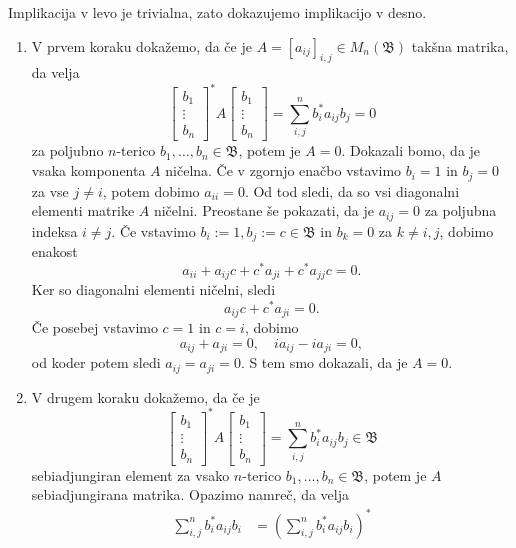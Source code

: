 \begin{dokaz}
    Implikacija v levo je trivialna, zato dokazujemo implikacijo v desno.
    \begin{enumerate}
        \item  V prvem koraku dokažemo, da če je $A = [a_{ij}]_{i, j} \in M_n (\mathfrak{B})$ takšna matrika, da velja $$\begin{bmatrix}
        b_1 \\ \vdots \\ b_n
    \end{bmatrix}^* A \begin{bmatrix}
        b_1 \\ \vdots \\ b_n
    \end{bmatrix} = \sum_{i, j} ^n b_i ^* a_{ij} b_j = 0$$
    za poljubno $n$-terico $b_1, \dots, b_n \in \mathfrak{B}$, potem je $A = 0$.
    Dokazali bomo, da je vsaka komponenta $A$ ničelna. Če v zgornjo enačbo vstavimo $b_i = 1$ in $b_j = 0$ za vse $j \neq i$, potem dobimo
    $a_{ii} = 0$. Od tod sledi, da so vsi diagonalni elementi matrike $A$ ničelni. 
    Preostane še pokazati, da je $a_{ij} = 0$ za poljubna indeksa $i \neq j$.
    Če vstavimo $b_i := 1, b_j := c \in \mathfrak{B}$ in $b_k = 0$ za $k \neq i, j$, dobimo enakost
    $$a_{ii} + a_{ij} c + c^* a_{ji}  + c^* a_{jj} c = 0.$$
    Ker so diagonalni elementi ničelni, sledi
    $$a_{ij} c + c^* a_{ji} = 0.$$
    Če posebej vstavimo $c = 1$ in $c = i$, dobimo
    $$a_{ij} + a_{ji} = 0, \quad i a_{ij} - i a_{ji} = 0,$$
    od koder potem sledi $a_{ij} = a_{ji} = 0$. S tem smo dokazali, da je $A = 0$.
        \item V drugem koraku dokažemo, da če je $$\begin{bmatrix}
            b_1 \\ \vdots \\ b_n
        \end{bmatrix}^* A \begin{bmatrix}
            b_1 \\ \vdots \\ b_n
        \end{bmatrix} = \sum_{i, j} ^n b_i ^* a_{ij} b_j \in \mathfrak{B}$$
        sebiadjungiran element za vsako $n$-terico $b_1, \dots, b_n \in \mathfrak{B}$, potem je $A$ sebiadjungirana matrika.
        Opazimo namreč, da velja
        \begin{align*}
            \sum_{i, j} ^n b_i ^* a_{ij} b_i &= \left(\sum_{i, j} ^n b_i ^* a_{ij} b_i\right)^* \\

\end{align*}
\end{enumerate}
\end{dokaz}
